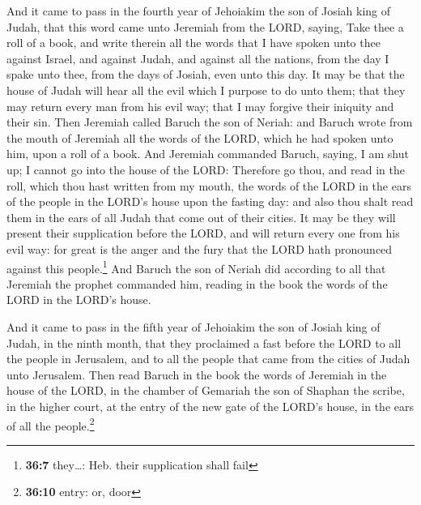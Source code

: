  And it came to pass in the fourth year of Jehoiakim the
son of Josiah king of Judah, that this word came unto Jeremiah from the
LORD, saying,  Take thee a roll of a book, and write
therein all the words that I have spoken unto thee against Israel, and
against Judah, and against all the nations, from the day I spake unto
thee, from the days of Josiah, even unto this day.  It may
be that the house of Judah will hear all the evil which I purpose to do
unto them; that they may return every man from his evil way; that I may
forgive their iniquity and their sin.  Then Jeremiah
called Baruch the son of Neriah: and Baruch wrote from the mouth of
Jeremiah all the words of the LORD, which he had spoken unto him, upon a
roll of a book.  And Jeremiah commanded Baruch, saying, I
am shut up; I cannot go into the house of the LORD: 
Therefore go thou, and read in the roll, which thou hast written from my
mouth, the words of the LORD in the ears of the people in the LORD's
house upon the fasting day: and also thou shalt read them in the ears of
all Judah that come out of their cities.  It may be they
will present their supplication before the LORD, and will return every
one from his evil way: for great is the anger and the fury that the LORD
hath pronounced against this people.\footnote{\textbf{36:7} they\ldots:
  Heb. their supplication shall fail}  And Baruch the son
of Neriah did according to all that Jeremiah the prophet commanded him,
reading in the book the words of the LORD in the LORD's house.

 And it came to pass in the fifth year of Jehoiakim the
son of Josiah king of Judah, in the ninth month, that they proclaimed a
fast before the LORD to all the people in Jerusalem, and to all the
people that came from the cities of Judah unto Jerusalem.
 Then read Baruch in the book the words of Jeremiah in
the house of the LORD, in the chamber of Gemariah the son of Shaphan the
scribe, in the higher court, at the entry of the new gate of the LORD's
house, in the ears of all the people.\footnote{\textbf{36:10} entry: or,
  door}

